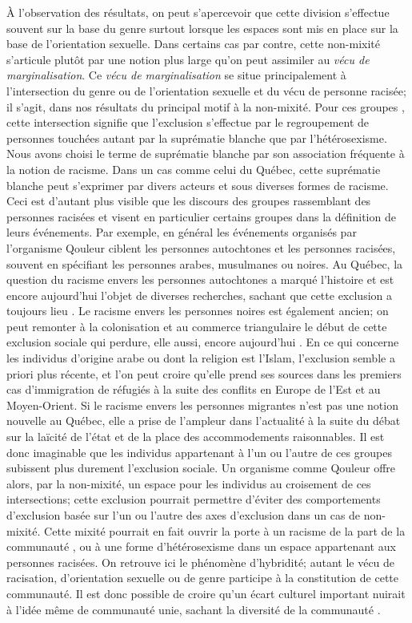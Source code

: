 À l'observation des résultats, on peut s'apercevoir que cette division s'effectue souvent sur la base du genre surtout lorsque les espaces sont mis en place sur la base de l'orientation sexuelle.
Dans certains cas par contre, cette non-mixité s'articule plutôt par une notion plus large qu'on peut assimiler au \emph{vécu de marginalisation}.
Ce \emph{vécu de marginalisation} se situe principalement à l'intersection du genre ou de l'orientation sexuelle et du vécu de personne racisée; il s'agit, dans nos résultats du principal motif à la non-mixité.
Pour ces groupes \lgbt{}, cette intersection signifie que l'exclusion s'effectue par le regroupement de personnes touchées autant par la suprématie blanche que par l'hétérosexisme.
Nous avons choisi le terme de suprématie blanche par son association fréquente à la notion de racisme.
Dans un cas comme celui du Québec, cette suprématie blanche peut s'exprimer par divers acteurs et sous diverses formes de racisme.
Ceci est d'autant plus visible que les discours des groupes rassemblant des personnes racisées et \lgbt{} visent en particulier certains groupes dans la définition de leurs événements.
Par exemple, en général les événements organisés par l'organisme Qouleur ciblent les personnes autochtones et les personnes racisées, souvent en spécifiant les personnes arabes, musulmanes ou noires.
Au Québec, la question du racisme envers les personnes autochtones a marqué l'histoire et est encore aujourd'hui l'objet de diverses recherches, sachant que cette exclusion a toujours lieu \missref{}.
Le racisme envers les personnes noires est également ancien; on peut remonter à la colonisation et au commerce triangulaire le début de cette exclusion sociale qui perdure, elle aussi, encore aujourd'hui \missref{}.
En ce qui concerne les individus d'origine arabe ou dont la religion est l'Islam, l'exclusion semble a priori plus récente, et l'on peut croire qu'elle prend ses sources dans les premiers cas d'immigration de réfugiés à la suite des conflits en Europe de l'Est et au Moyen-Orient.
Si le racisme envers les personnes migrantes n'est pas une notion nouvelle au Québec, elle a prise de l'ampleur dans l'actualité à la suite du débat sur la laïcité de l'état et de la place des accommodements raisonnables.
Il est donc imaginable que les individus \lgbt{} appartenant à l'un ou l'autre de ces groupes subissent plus durement l'exclusion sociale.
Un organisme comme Qouleur offre alors, par la non-mixité, un espace pour les individus au croisement de ces intersections;  cette exclusion pourrait permettre d'éviter des comportements d'exclusion basée sur l'un ou l'autre des axes d'exclusion dans un cas de non-mixité.
Cette mixité pourrait en fait ouvrir la porte à un racisme de la part de la communauté \lgbt{}, ou à une forme d'hétérosexisme dans un espace appartenant aux personnes racisées.
On retrouve ici le phénomène d'hybridité; autant le vécu de racisation, d'orientation sexuelle ou de genre participe à la constitution de cette communauté.
Il est donc possible de croire qu'un écart culturel important nuirait à l'idée même de communauté unie, sachant la diversité de la communauté \lgbt{}.

